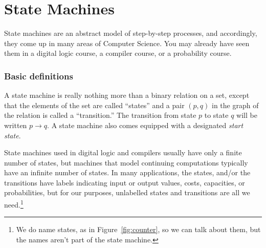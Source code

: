\chapter{State Machines}\label{state_machine_chap}

\def\movesto{\mathrel{\longrightarrow}}

\def\lexle{\mathrel{\preceq_{\text{lex}}}}
\def\lex<{\mathrel{\prec_{\text{lex}}}}
\def\coordle{\mathrel{\preceq_{\text{c}}}}
\def\coord<{\mathrel{\prec_{\text{c}}}}

\providecommand{\boys}{\text{the-Boys}}
\providecommand{\girls}{\text{the-Girls}}
\providecommand{\qst}{\text{$q_0$}}
\providecommand{\none}{\texttt{none}}
\providecommand{\girln}{\text{$\girls \union \set{\none}$}}
\providecommand{\boyn}{\text{$\boys \union \set{\none}$}}
\providecommand{\sere}{\text{\emph{serenading}}}
\providecommand{\suit}{\text{\emph{suitors}}}
\providecommand{\fav}{\text{\emph{favorite}}}
\providecommand{\nex}{\text{\emph{next}}}
\providecommand{\tgn}{\text{\emph{total-girls-names}}}


State machines are an abstract model of step-by-step processes, and
accordingly, they come up in many areas of Computer Science.  You may
already have seen them in a digital logic course, a compiler course, or a
probability course.

\subsection{Basic definitions}

A state machine is really nothing more than a binary relation on a set,
except that the elements of the set are called ``states'' and a pair
$(p,q)$ in the graph of the relation is called a ``transition.''  The
transition from state $p$ to state $q$ will be written $p \movesto q$.
A state machine also comes equipped with a designated \emph{start state}.

State machines used in digital logic and compilers usually have only a
finite number of states, but machines that model continuing computations
typically have an infinite number of states.  In many applications, the
states, and/or the transitions have labels indicating input or output
values, costs, capacities, or probabilities, but for our purposes,
unlabelled states and transitions are all we need.\footnote{We do name
states, as in Figure~\ref{fig:counter}, so we can talk about them, but the
names aren't part of the state machine.}

